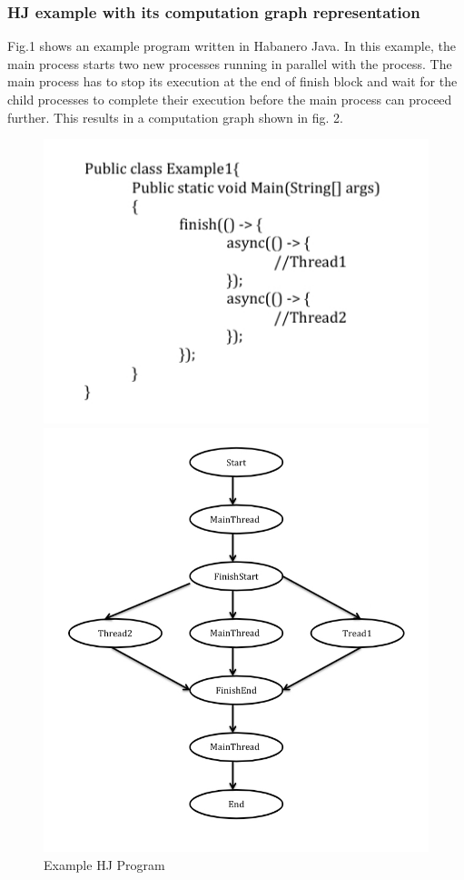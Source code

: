 \subsubsection{HJ example with its computation graph representation}
Fig.1 shows an example program written in Habanero Java. In this example, the main process starts two new processes running in parallel with the process. The main process has to stop its execution at the end of finish block and wait for the child processes to complete their execution before the main process can proceed further. This results in a computation graph shown in fig. 2. 

\begin{figure}[h!]
\centering
\begin{minipage}[b]{0.35\linewidth}
    \includegraphics[scale=0.4]{../figs/Fig1.jpg} 
\caption{Example HJ Program}
\label{fig:minipage1}
\end{minipage}
\quad
\begin{minipage}[b]{0.35\linewidth}
\includegraphics[scale=0.2]{../figs/Fig2.jpg}

\end{minipage}
\end{figure}
